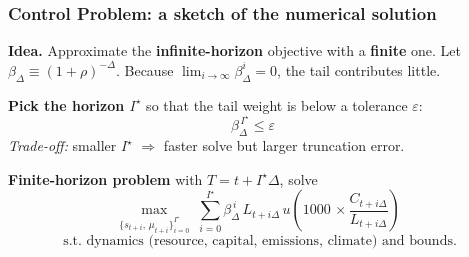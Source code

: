 \documentclass[xcolor=x11names,compress,aspectratio=169]{beamer}%
\makeatletter
\renewenvironment{itemize}{\begin{compactitemize}[<+-| alert@+>]}{\end{compactitemize}}
\makeatother
\begin{document}
\begin{frame}%
%

\frametitle{Control Problem: a sketch of the numerical solution}%


\begin{itemize}
\item \textbf{Idea.} Approximate the \textbf{infinite-horizon} objective with
a \textbf{finite} one. Let $\beta_{\Delta}\equiv(1+\rho)^{-\Delta}$. Because
$\lim_{i\rightarrow\infty}\beta_{\Delta}^{i}=0$, the tail contributes little.

\item \textbf{Pick the horizon $I^{\star}$ }so that the tail weight is below a
tolerance $\varepsilon$:
\[
\beta_{\Delta}^{\,I^{\star}}\leq\varepsilon\quad
\]
\emph{Trade-off:} smaller $I^{\star}$ $\Rightarrow$ faster solve but larger
truncation error.

\item \textbf{Finite-horizon problem }with $T=t+I^{\star}\Delta$, solve
\[
\max_{\{s_{t+i},\,\mu_{t+i}\}_{i=0}^{I^{\star}}}\;\sum_{i=0}^{I^{\star}}%
\beta_{\Delta}^{\,i}\,L_{t+i\Delta}\,u\!\left(  1000\,\times\frac
{C_{t+i\Delta}}{L_{t+i\Delta}}\right)  \;
\]%
\[
\text{s.t. dynamics (resource, capital, emissions, climate) and bounds.}%
\]

\end{itemize}

%

\transboxout
\end{frame}%
%
\end{document}
